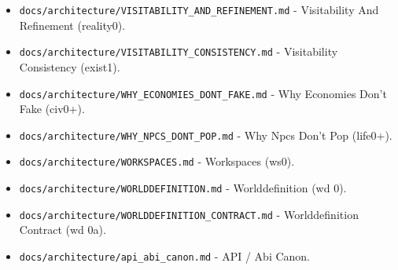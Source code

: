 \documentclass[9pt,a4paper,openany]{book}
\begin{document}
\begin{itemize}
\item \texttt{docs/\allowbreak{}architecture/\allowbreak{}VISITABILITY\_\allowbreak{}AND\_\allowbreak{}REFINEMENT.\allowbreak{}md} -\allowbreak{} Visitability And Refinement (reality0).\allowbreak{}
\end{itemize}

\begin{itemize}
\item \texttt{docs/\allowbreak{}architecture/\allowbreak{}VISITABILITY\_\allowbreak{}CONSISTENCY.\allowbreak{}md} -\allowbreak{} Visitability Consistency (exist1).\allowbreak{}
\end{itemize}

\begin{itemize}
\item \texttt{docs/\allowbreak{}architecture/\allowbreak{}WHY\_\allowbreak{}ECONOMIES\_\allowbreak{}DONT\_\allowbreak{}FAKE.\allowbreak{}md} -\allowbreak{} Why Economies Don't Fake (civ0+).\allowbreak{}
\end{itemize}

\begin{itemize}
\item \texttt{docs/\allowbreak{}architecture/\allowbreak{}WHY\_\allowbreak{}NPCS\_\allowbreak{}DONT\_\allowbreak{}POP.\allowbreak{}md} -\allowbreak{} Why Npcs Don't Pop (life0+).\allowbreak{}
\end{itemize}

\begin{itemize}
\item \texttt{docs/\allowbreak{}architecture/\allowbreak{}WORKSPACES.\allowbreak{}md} -\allowbreak{} Workspaces (ws0).\allowbreak{}
\end{itemize}

\begin{itemize}
\item \texttt{docs/\allowbreak{}architecture/\allowbreak{}WORLDDEFINITION.\allowbreak{}md} -\allowbreak{} Worlddefinition (wd 0).\allowbreak{}
\end{itemize}

\begin{itemize}
\item \texttt{docs/\allowbreak{}architecture/\allowbreak{}WORLDDEFINITION\_\allowbreak{}CONTRACT.\allowbreak{}md} -\allowbreak{} Worlddefinition Contract (wd 0a).\allowbreak{}
\end{itemize}

\begin{itemize}
\item \texttt{docs/\allowbreak{}architecture/\allowbreak{}api\_\allowbreak{}abi\_\allowbreak{}canon.\allowbreak{}md} -\allowbreak{} API /\allowbreak{} Abi Canon.\allowbreak{}
\end{itemize}
\end{document}
